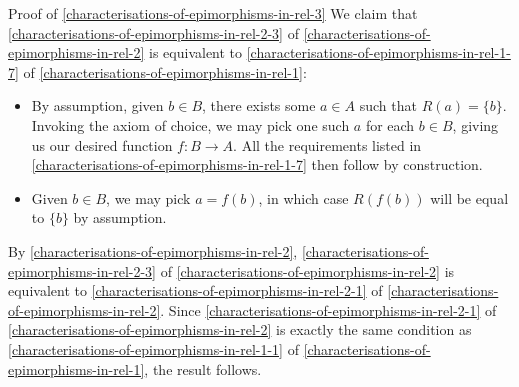 \begin{Proof}{Proof of \cref{characterisations-of-epimorphisms-in-rel-3}}%
    We claim that \cref{characterisations-of-epimorphisms-in-rel-2-3} of \cref{characterisations-of-epimorphisms-in-rel-2} is equivalent to \cref{characterisations-of-epimorphisms-in-rel-1-7} of \cref{characterisations-of-epimorphisms-in-rel-1}:
    \begin{itemize}
        \item{}By assumption, given $b\in B$, there exists some $a\in A$ such that $R(a)=\{b\}$. Invoking the axiom of choice, we may pick one such $a$ for each $b\in B$, giving us our desired function $f\colon B\to A$. All the requirements listed in \cref{characterisations-of-epimorphisms-in-rel-1-7} then follow by construction.
        \item{}Given $b\in B$, we may pick $a=f(b)$, in which case $R(f(b))$ will be equal to $\{b\}$ by assumption.
    \end{itemize}
    By \cref{characterisations-of-epimorphisms-in-rel-2}, \cref{characterisations-of-epimorphisms-in-rel-2-3} of \cref{characterisations-of-epimorphisms-in-rel-2} is equivalent to \cref{characterisations-of-epimorphisms-in-rel-2-1} of \cref{characterisations-of-epimorphisms-in-rel-2}. Since \cref{characterisations-of-epimorphisms-in-rel-2-1} of \cref{characterisations-of-epimorphisms-in-rel-2} is exactly the same condition as \cref{characterisations-of-epimorphisms-in-rel-1-1} of \cref{characterisations-of-epimorphisms-in-rel-1}, the result follows.


\end{Proof}
